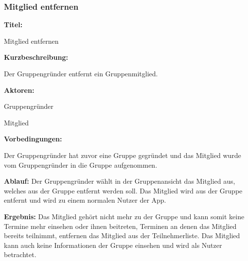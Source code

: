 \documentclass{scrartcl}
\begin{document}
	\subsubsection{Mitglied entfernen}
	\begin{description}
		\item \textbf{Titel:}
		\begin{description}
			\item Mitglied entfernen
		\end{description}
		\item \textbf{Kurzbeschreibung:}
		\begin{description}
			\item Der Gruppengründer entfernt ein Gruppenmitglied.
		\end{description}
		\item \textbf{Aktoren:}
		\begin{description}
			\item Gruppengründer
			\item Mitglied
		\end{description}
		\item \textbf{Vorbedingungen:}
		\begin{description}
			\item Der Gruppengründer hat zuvor eine Gruppe gegründet und das Mitglied wurde vom Gruppengründer in die Gruppe aufgenommen.
		\end{description}
		\item \textbf{Ablauf:} \newline Der Gruppengründer wählt in der Gruppenansicht das Mitglied aus, welches aus der Gruppe entfernt werden soll. Das Mitglied wird aus der Gruppe entfernt und wird zu einem normalen Nutzer der App.
		\item \textbf{Ergebnis:} \newline Das Mitglied gehört nicht mehr zu der Gruppe und kann somit keine Termine mehr einsehen oder ihnen beitreten, Terminen an denen das Mitglied bereits teilnimmt, entfernen das Mitglied aus der Teilnehmerliste. Das Mitglied kann auch keine Informationen der Gruppe einsehen und wird als Nutzer betrachtet.
	\end{description}
	
	\newpage
	
\end{document}
